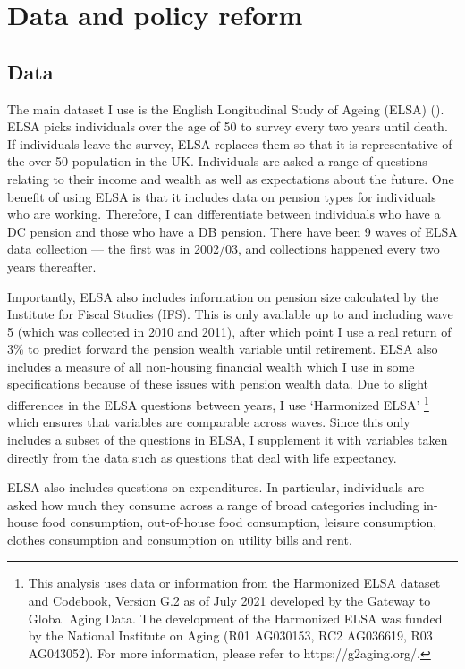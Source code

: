 \documentclass[12pt]{article}
\begin{document}
\section{Data and policy reform}

\subsection{Data}

The main dataset I use is the English Longitudinal Study of Ageing (ELSA)
(\cite{main-elsa-citation}). ELSA picks individuals over the age of 50 to survey
every two years until death. If individuals leave the survey, ELSA replaces them
so that it is representative of the over 50 population in the UK. Individuals
are asked a range of questions relating to their income and wealth as well as
expectations about the future. One benefit of using ELSA is that it includes
data on pension types for individuals who are working. Therefore, I can
differentiate between individuals who have a DC pension and those who have a DB
pension. There have been 9 waves of ELSA data collection --- the first was in
2002/03, and collections happened every two years thereafter.

Importantly, ELSA also includes information on pension size calculated by the
Institute for Fiscal Studies (IFS). This is only available up to and including
wave 5 (which was collected in 2010 and 2011), after which point I use a real return
of 3\% to predict forward the pension wealth variable until retirement. ELSA
also includes a measure of all non-housing financial wealth which I use in some
specifications because of these issues with pension wealth data. Due to slight
differences in the ELSA questions between years, I use `Harmonized ELSA'
\footnote{This analysis uses data or information from the Harmonized ELSA
  dataset and Codebook, Version G.2 as of July 2021 developed by the Gateway to
  Global Aging Data. The development of the Harmonized ELSA was funded by the
  National Institute on Aging (R01 AG030153, RC2 AG036619, R03 AG043052). For more
  information, please refer to https://g2aging.org/.} which ensures that variables
are comparable across waves. Since this only includes a subset of the questions
in ELSA, I supplement it with variables taken directly from the data such as
questions that deal with life expectancy.

ELSA also includes questions on expenditures. In particular, individuals are
asked how much they consume across a range of broad categories including
in-house food consumption, out-of-house food consumption, leisure consumption,
clothes consumption and consumption on utility bills and rent.
\end{document}
